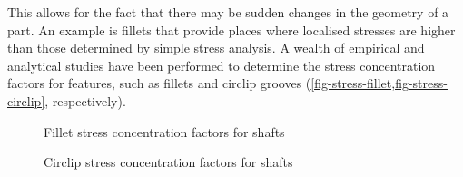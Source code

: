 This allows for the fact that there may be sudden changes in the geometry of a part. An example is fillets that provide places where localised stresses are higher than those determined by simple stress analysis. A wealth of empirical and analytical studies have been performed to determine the stress concentration factors for features, such as fillets and circlip grooves (\cref{fig-stress-fillet,fig-stress-circlip}, respectively). 

\begin{figure}[t!]
  
    \hfill
    \hfill
    \hfill
    
    \vspace{1em}
    \caption{Fillet stress concentration factors for shafts}\label{fig-stress-fillet}
\end{figure}

\begin{figure}[t]
    
    \hfill
    \hfill
    \hfill
    
    \vspace{1em}
    \caption{Circlip stress concentration factors for shafts}\label{fig-stress-circlip}
\end{figure}

